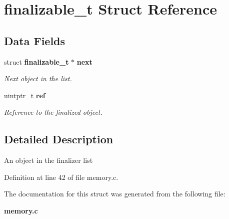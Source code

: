 \section{finalizable\_\-t Struct Reference}
\label{structfinalizable__t}
\subsection*{Data Fields}
\begin{DoxyCompactItemize}
\item 
struct {\bf finalizable\_\-t} $\ast$ {\bf next}\label{structfinalizable__t_ab687e84d31c2209c259ced01990c5108}

\begin{DoxyCompactList}\small\item\em Next object in the list. \item\end{DoxyCompactList}\item 
uintptr\_\-t {\bf ref}\label{structfinalizable__t_a32dc78b64baec5a9c52389376c29f1b6}

\begin{DoxyCompactList}\small\item\em Reference to the finalized object. \item\end{DoxyCompactList}\end{DoxyCompactItemize}


\subsection{Detailed Description}
An object in the finalizer list 

Definition at line 42 of file memory.c.



The documentation for this struct was generated from the following file:\begin{DoxyCompactItemize}
\item 
{\bf memory.c}\end{DoxyCompactItemize}
